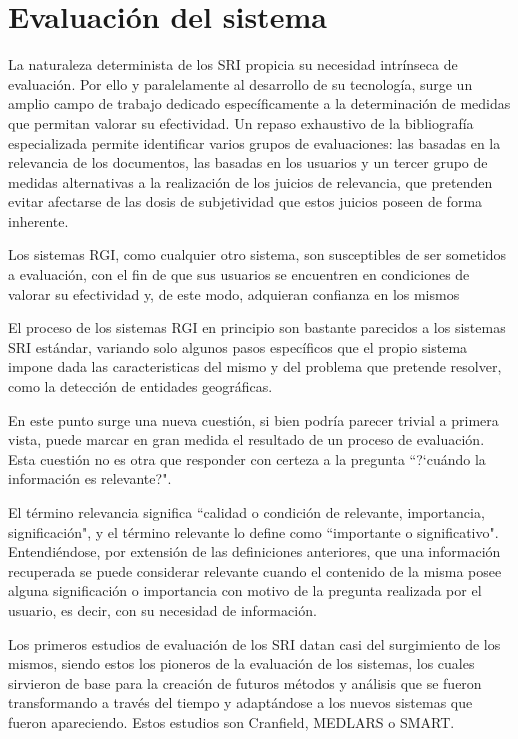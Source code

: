 \section{Evaluación del sistema}\label{sec:eval}

La naturaleza determinista de los SRI propicia su necesidad intrínseca de
evaluación. Por ello y paralelamente al desarrollo de su tecnología, surge un
amplio campo de trabajo dedicado específicamente a la determinación de medidas
que permitan valorar su efectividad. Un repaso exhaustivo de la bibliografía
especializada permite identificar varios grupos de evaluaciones: las basadas
en la relevancia de los documentos, las basadas en los usuarios y un tercer
grupo de medidas alternativas a la realización de los juicios de relevancia,
que pretenden evitar afectarse de las dosis de subjetividad que estos juicios
poseen de forma inherente.

Los sistemas RGI, como cualquier otro sistema, son susceptibles de ser
sometidos a evaluación, con el fin de que sus usuarios se encuentren en
condiciones de valorar su efectividad y, de este modo, adquieran confianza
en los mismos

El proceso de los sistemas RGI en principio son bastante parecidos a los 
sistemas SRI estándar, variando solo algunos pasos específicos que el propio
sistema impone dada las caracteristicas del mismo y del problema que pretende
resolver, como la detección de entidades geográficas. \cite{Kornai2005}

En este punto surge una nueva cuestión, si bien podría parecer trivial a
primera vista, puede marcar en gran medida el resultado de un proceso de
evaluación. Esta cuestión no es otra que responder con certeza a la pregunta
``?`cuándo la información es relevante?".

El término relevancia significa ``calidad o condición de relevante,
importancia, significación", y el término relevante lo define como
``importante o significativo". Entendiéndose, por extensión de las definiciones
anteriores, que una información recuperada se puede considerar relevante
cuando el contenido de la misma posee alguna significación o importancia
con motivo de la pregunta realizada por el usuario, es decir, con su
necesidad de información.

Los primeros estudios de evaluación de los SRI datan casi del surgimiento de
los mismos, siendo estos los pioneros de la evaluación de los sistemas, los
cuales sirvieron de base para la creación de futuros métodos y análisis que
se fueron transformando a través del tiempo y adaptándose a los nuevos
sistemas que fueron apareciendo. Estos estudios son Cranfield,
MEDLARS o SMART. \cite{bors2000}


\newpage

